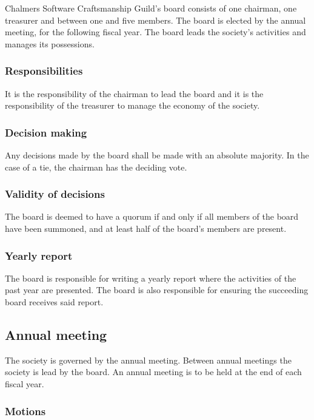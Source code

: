 \documentclass[a4paper]{article}
\newcommand{\name}{Chalmers Software Craftsmanship Guild}
\begin{document}
\name{}'s board consists of one chairman, one treasurer and between one and five
members.  The board is elected by the annual meeting, for the following fiscal
year. The board leads the society's activities and manages its possessions.

\subsubsection{Responsibilities}

It is the responsibility of the chairman to lead the board
and it is the responsibility of the treasurer to manage the economy of the
society.

\subsubsection{Decision making}

Any decisions made by the board shall be made with an absolute majority. In the
case of a tie, the chairman has the deciding vote.

\subsubsection{Validity of decisions}

The board is deemed to have a quorum if and only if all
members of the board have been summoned, and at least half of the board's
members are present.

\subsubsection{Yearly report}

The board is responsible for writing a yearly report where the
activities of the past year are presented. The board is also responsible for
ensuring the succeeding board receives said report.


\subsection{Annual meeting}
\label{sec:annualmeeting}

The society is governed by the annual meeting. Between annual meetings the
society is lead by the board. An annual meeting is to be held at the end of each
fiscal year.

\subsubsection{Motions}
\end{document}
